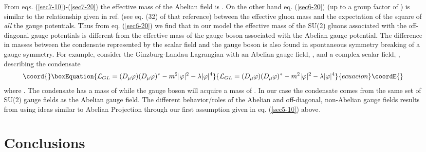 \documentclass[a4paper,aps,showpacs]{revtex4}
\begin{document}
From eqs. (\ref{sec7-10})-(\ref{sec7-20}) the effective mass
of the Abelian field is \coordHE{}. On the
other hand eq. (\ref{sec6-20}) (up to a group factor of
\coordHE{}) is similar to the relationship given in ref.
\cite{cw1} (see eq. (32) of that reference) between the
effective gluon mass and the expectation of the square
of {\it all} the gauge potentials. Thus from eq.
(\ref{sec6-20}) we find that in our model the effective mass of
the SU(2) gluons associated with the off-diagonal
gauge potentials is different from the effective mass of the
gauge boson associated with the Abelian gauge potential. The
difference in masses between the condensate represented
by the scalar field and the gauge boson is also found in
spontaneous symmetry breaking of a gauge symmetry. For example,
consider the Ginzburg-Landau Lagrangian with an Abelian gauge
field, \coordHE{}, and a complex scalar field, \myHighlight{$\varphi$}\coordHE{},
describing the condensate
\begin{equation}\coord{}\boxEquation{
\label{gl}
{\cal L}_{GL} = (D_{\mu} \varphi)(D_{\mu} \varphi)^{\ast}
- m^2 |\varphi | ^2
-\lambda | \varphi |^4
}{
{\cal L}_{GL} = (D_{\mu} \varphi)(D_{\mu} \varphi)^{\ast}
- m^2 |\varphi | ^2
-\lambda | \varphi |^4
}{ecuacion}\coordE{}\end{equation}
where \coordHE{}. The condensate has
a mass of \coordHE{} while the gauge boson \coordHE{} will acquire a mass
of \coordHE{}. In our case the condensate
comes from the same set of SU(2) gauge fields as the Abelian
gauge field. The different behavior/roles of the Abelian and
off-diagonal, non-Abelian gauge fields results from using
ideas similar to Abelian Projection through our first assumption
given in eq. (\ref{sec5-10}) above.

\section{Conclusions}
\end{document}
